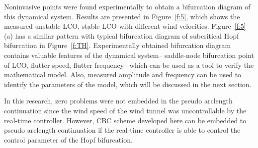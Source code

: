 \documentclass[openacc]{rsproca_new}%
\newcommand{\Fref}[1]{Figure~\ref{#1}}
\begin{document}
Noninvasive points were found experimentally to obtain a bifurcation diagram of this dynamical system. Results are presented in \Fref{f:5}, which shows the measured unstable LCO, stable LCO with different wind velocities. \Fref{f:5} (a) has a similar pattern with typical bifurcation diagram of subcritical Hopf bifurcation in \Fref{f:TH}. Experimentally obtained bifurcation diagram contains valuable features of the dynamical system-- saddle-node bifurcation point of LCO, flutter speed, flutter frequency-- which can be used as a tool to verify the mathematical model. Also, measured amplitude and frequency can be used to identify the parameters of the model, which will be discussed in the next section.

In this research, zero problems were not embedded in the pseudo arclength continuation since the wind speed of the wind tunnel was uncontrollable by the real-time controller. However, CBC scheme developed here can be embedded to pseudo arclength continuation if the real-time controller is able to control the control parameter of the Hopf bifurcation.
\end{document}
